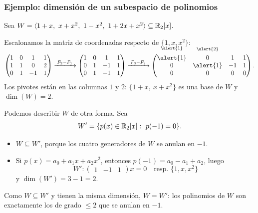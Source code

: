 \begin{frame}[allowframebreaks, t]
    \frametitle{Ejemplo: dimensión de un subespacio de polinomios}

    \begin{example}
        Sea $W=\langle 1+x,\ x+x^2,\ 1-x^2,\ 1+2x+x^2\rangle\subseteq\R_2[x]$.
    \end{example}

    Escalonamos la matriz de coordenadas respecto de $\{1,x,x^2\}$:

    \medskip

    \[
        \begin{pmatrix}
            1&0&1&1\\
            1&1&0&2\\
            0&1&-1&1
        \end{pmatrix}
        \xrightarrow{\;F_2-F_1\;}
        \begin{pmatrix}
            1&0&1&1\\
            0&1&-1&1\\
            0&1&-1&1
        \end{pmatrix}
        \xrightarrow{\;F_3-F_2\;}
        \begin{pmatrix}
            \smash{\overset{\raisebox{1.5ex}{$\scriptstyle\alert{1}$}}{\alert{1}}}&\smash{\overset{\raisebox{1.5ex}{$\scriptstyle\alert{2}$}}{0}}&1&1\\
            0&\alert{1}&-1&1\\
            0&0&0&0
        \end{pmatrix}.
    \]
    Los pivotes están en las columnas $1$ y $2$: $\{1+x,\ x+x^2\}$ es una
    base de $W$ y $\dim(W)=2$.

    \framebreak

    Podemos describir $W$ de otra forma. Sea
    \[
        W'=\{p(x)\in\R_2[x]:\ p(-1)=0\}.
    \]
    \begin{itemize}
        \item $W\subseteq W'$, porque los cuatro generadores de $W$ se anulan
        en $-1$.
        \item Si $p(x)=a_0+a_1x+a_2x^2$, entonces $p(-1)=a_0-a_1+a_2$, luego
    \[W'\colon\begin{pmatrix}1&-1&1\end{pmatrix}x=0 \quad \text{resp. 
        }\{1,x,x^2\}\] y $\dim(W')=3-1=2$.
    \end{itemize}

    \medskip

    Como $W\subseteq W'$ y tienen la misma dimensión, $W=W'$: los
    polinomios de $W$ son exactamente los de grado $\leq2$ que se anulan
    en $-1$.
\end{frame}

